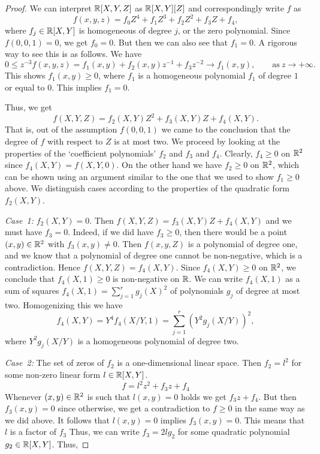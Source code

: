 \begin{proof}
	We can interpret $\mathbb{R}[X,Y,Z]$ as $\mathbb{R}[X,Y][Z]$ and correspondingly write $f$ as 
	\[
	f(x,y,z) = f_0 Z^4 + f_1 Z^3 + f_2 Z^2 + f_3 Z + f_4,
	\] 
	where $f_j \in \mathbb{R}[X,Y]$ is homogeneous of degree $j$, or the zero polynomial. Since $f(0,0,1)=0$, we get $f_0=0$. But then we can also see that $f_1 = 0$. A rigorous way to see this is as follows. We have 
	\[
		0 \le z^{-3} f(x,y,z) = f_1(x,y)  + f_2(x,y) z^{-1} + f_3 z^{-2} \to f_1(x,y), \qquad \text{as} \ z \to +\infty.
	\]
	This shows $f_1(x,y) \ge 0$, where $f_1$ is a homogeneous polynomial $f_1$ of degree $1$ or equal to $0$. This implies $f_1=0$. 

	Thus, we get
	\[
		f(X,Y,Z) = f_2(X,Y) Z^2 + f_3(X,Y) Z + f_4(X,Y).
	\]
	That is, out of the assumption $f(0,0,1)$ we came to the conclusion that the degree of $f$ with respect to $Z$ is at most two. We proceed by looking at the properties of the `coefficient polynomials' $f_2$ and $f_3$ and $f_4$. Clearly, $f_4 \ge 0$ on $\mathbb{R}^2$ since $f_4(X,Y)= f(X,Y,0)$. On the other hand we have $f_2 \ge 0$ on $\mathbb{R}^2$, which can be shown using an argument similar to the one that we used to show $f_1 \ge 0$ above. We distinguish cases according to the properties of the quadratic form $f_2(X,Y)$.
	
	\emph{Case~1:}	$f_2(X,Y)=0$. Then $f(X,Y,Z) = f_3(X,Y) Z + f_4(X,Y)$ and we must have $f_3 = 0$. Indeed, if we did have $f_3 \ge 0$, then there would be a point $(x,y) \in \mathbb{R}^2$ with $f_3(x,y) \ne 0$. Then $f(x,y,Z)$ is a polynomial of degree one, and we know that a polynomial of degree one cannot be non-negative, which is a contradiction. Hence $f(X,Y,Z) = f_4(X,Y)$. Since $f_4(X,Y) \ge 0$ on $\mathbb{R}^2$, we conclude that $f_4(X,1) \ge 0$ is non-negative on $\mathbb{R}$. We can write $f_4(X,1)$ as a sum of squares $f_4(X,1) = \sum_{j=1}^r g_j(X)^2$ of polynomials $g_j$ of degree at most two.  Homogenizing this we have 
	\[
		f_4(X,Y) = Y^4 f_4(X/Y,1) = \sum_{j=1}^r (Y^2 g_j(X/Y))^2,
	\]
	where $Y^2 g_j(X/Y)$ is a homogeneous polynomial of degree two. 	

	\emph{Case~2:} The set of zeros of $f_2$ is a one-dimensional linear space. Then $f_2 = l^2$ for some non-zero linear form $l \in \mathbb{R}[X,Y]$. 	
	\[
		f = l^2 z^2 + f_3 z + f_4 
	\]
	Whenever $(x,y) \in \mathbb{R}^2$ is such that $l(x,y)=0$ holds we get $f_3 z  + f_4$. But then $f_3(x,y)=0$ since otherwise, we get a contradiction to $f \ge 0$ in the same way as we did above. It follows that $l(x,y)=0$ implies $f_3(x,y)=0$. This means that $l$ is a factor of $f_3$ Thus, we can write  $f_3 = 2 l g_2$ for some quadratic polynomial $g_2 \in \mathbb{R}[X,Y]$. Thus, 
	

\end{proof}
